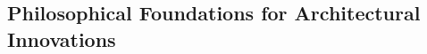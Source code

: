 \documentclass[11pt, oneside]{article}   	%
\begin{document}












\subsection{Philosophical Foundations for Architectural Innovations}
\end{document}
